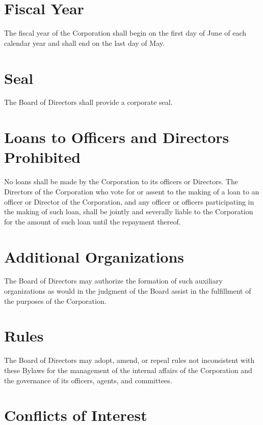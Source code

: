 \section{Fiscal Year}

The fiscal year of the Corporation shall begin on the first day of June of each
calendar year and shall end on the last day of May.

\section{Seal}

The Board of Directors shall provide a corporate seal.

\section{Loans to Officers and Directors Prohibited}

No loans shall be made by the Corporation to its officers or Directors. The
Directors of the Corporation who vote for or assent to the making of a loan to
an officer or Director of the Corporation, and any officer or officers
participating in the making of such loan, shall be jointly and severally liable
to the Corporation for the amount of such loan until the repayment thereof.

\section{Additional Organizations}

The Board of Directors may authorize the formation of such auxiliary
organizations as would in the judgment of the Board assist in the fulfillment
of the purposes of the Corporation.

\section{Rules}

The Board of Directors may adopt, amend, or repeal rules not inconsistent with
these Bylaws for the management of the internal affairs of the Corporation and
the governance of its officers, agents, and committees.

\section{Conflicts of Interest}

